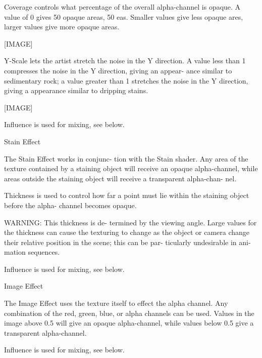        Coverage controls what percentage
       of the overall alpha-channel is
       opaque. A value of 0 gives 50%
       opaque areas, 50%
       eas. Smaller values give less
       opaque ares, larger values give
       more opaque areas.

       [IMAGE]

       Y-Scale lets the artist stretch the
       noise in the Y direction. A value
       less than 1 compresses the noise in
       the Y direction, giving an appear-
       ance similar to sedimentary rock; a
       value greater than 1 stretches the
       noise in the Y direction, giving a
       appearance similar to dripping
       stains.

       [IMAGE]

       Influence is used for mixing, see
       below.



       Stain Effect

       The Stain Effect works in conjunc-
       tion with the Stain shader. Any
       area of the texture contained by a
       staining object will receive an
       opaque alpha-channel, while areas
       outside the staining object will
       receive a transparent alpha-chan-
       nel.

       Thickness is used to control how
       far a point must lie within the
       staining object before the alpha-
       channel becomes opaque.

            WARNING: This thickness is de-
            termined by the viewing angle.
            Large values for the thickness
            can cause the texturing to
            change as the object or camera
            change their relative position
            in the scene; this can be par-
            ticularly undesirable in ani-
            mation sequences.

       Influence is used for mixing, see
       below.



       Image Effect

       The Image Effect uses the texture
       itself to effect the alpha channel.
       Any combination of the red, green,
       blue, or alpha channels can be
       used. Values in the image above 0.5
       will give an opaque alpha-channel,
       while values below 0.5 give a
       transparent alpha-channel.

       Influence is used for mixing, see
       below.



